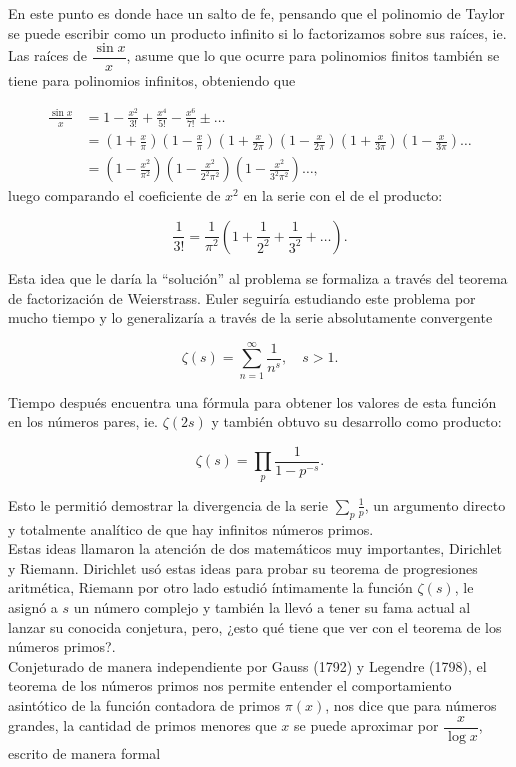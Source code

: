 En este punto es donde hace un salto de fe, pensando que el polinomio de Taylor se puede escribir como un producto infinito si lo factorizamos sobre sus raíces, ie. Las  raíces de $\dfrac{\sin x}{x}$, asume que lo que ocurre para polinomios finitos también se tiene para polinomios infinitos, obteniendo que

\begin{align*}
    \frac{\sin x}{x}&=1-\frac{x^2}{3!}+\frac{x^4}{5!}-\frac{x^6}{7!}\pm\ldots\\
    &=\left(1+\frac{x}{\pi}\right)\left(1-\frac{x}{\pi}\right)\left(1+\frac{x}{2\pi}\right)\left(1-\frac{x}{2\pi}\right)\left(1+\frac{x}{3\pi}\right)\left(1-\frac{x}{3\pi}\right)\ldots\\
&=\left(1-\frac{x^2}{\pi^2}\right)\left(1-\frac{x^2}{2^2\pi^2}\right)\left(1-\frac{x^2}{3^2\pi^2}\right)\ldots,
\end{align*}
luego comparando el coeficiente de $x^2$ en la serie con el de el producto:

$$\frac{1}{3!}=\frac{1}{\pi^2}\left(1+\frac{1}{2^2}+\frac{1}{3^2}+\ldots\right).$$

Esta idea que le daría la ``solución'' al problema se formaliza a través del teorema de factorización de Weierstrass. Euler seguiría estudiando este problema por mucho tiempo y lo generalizaría a través de la serie absolutamente convergente

$$\zeta(s)=\sum_{n=1}^{\infty}\frac{1}{n^s}, \quad s>1.$$

Tiempo después encuentra una fórmula para obtener los valores de esta función en los números pares, ie. $\zeta(2s)$ y también obtuvo su desarrollo como producto:

$$\zeta(s)=\prod_{p}\frac{1}{1-p^{-s}}.$$

Esto le permitió demostrar la divergencia de la serie $\displaystyle \sum_p\frac{1}{p}$, un argumento directo y totalmente analítico de que hay infinitos números primos.\\

Estas ideas llamaron la atención de dos matemáticos muy importantes, Dirichlet y Riemann. Dirichlet usó estas ideas para probar su teorema de progresiones aritmética, Riemann por otro lado estudió íntimamente la función $\zeta(s)$, le asignó a $s$ un número complejo y también la llevó a tener su fama actual al lanzar su conocida conjetura, pero, ¿esto qué tiene que ver con el teorema de los números primos?.\\

Conjeturado de manera independiente por Gauss (1792) y Legendre (1798), el teorema de los números primos nos permite entender el comportamiento asintótico de la función contadora de  primos $\pi(x)$, nos dice  que para números grandes, la cantidad de primos menores que $x$ se puede aproximar por $\dfrac{x}{\log x}$, escrito de manera formal

